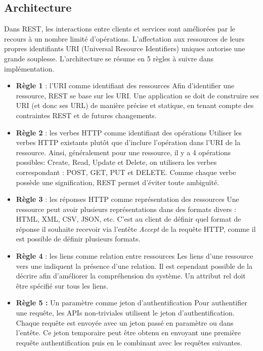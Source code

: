 \subsection{Architecture}
Dans REST, les interactions entre clients et services sont améliorées par le recours à un nombre limité d'opérations. L'affectation aux ressources de leurs propres identifiants URI (Universal Resource Identifiers) uniques autorise une grande souplesse. L'architecture se résume en 5 règles à suivre dans implémentation.\cite{refRegles}
\begin{itemize}
	\item \textbf{Règle 1} : l'URI comme identifiant des ressources\newline
	      Afin d'identifier une ressource, REST se base sur les URI. Une application se doit de construire ses URI (et donc ses URL) de manière précise et statique, en tenant compte des contraintes REST et de futures changements.
	\item \textbf{Règle 2} : les verbes HTTP comme identifiant des opérations\newline
	      Utiliser les verbes HTTP existants plutôt que d'inclure l'opération dans l'URI de la ressource. Ainsi, généralement pour une ressource, il y a 4 opérations possibles: Create, Read, Update et Delete, on utilisera les verbes correspondant : POST, GET, PUT et DELETE.
	      Comme chaque verbe possède une signification, REST permet d'éviter toute ambiguïté.
	\item \textbf{Règle 3} : les réponses HTTP comme représentation des ressources\newline
	      Une ressource peut avoir plusieurs représentations dans des formats divers : HTML, XML, CSV, JSON, etc. C'est au client de définir quel format de réponse il souhaite recevoir via l'entête \emph{Accept} de la requête HTTP, comme il est possible de définir plusieurs formats.
	\item \textbf{Règle 4} : les liens comme relation entre ressources\newline
	      Les liens d'une ressource vers une indiquent la présence d'une relation. Il est cependant possible de la décrire afin d'améliorer la compréhension du système. Un attribut rel doit être spécifié sur tous les liens.
	\item \textbf{Règle 5 :} Un paramètre comme jeton d'authentification\newline
	      Pour authentifier une requête, les APIs non-triviales utilisent le jeton d'authentification. Chaque requête est envoyée avec un jeton passé en paramètre ou dans l'entête. Ce jeton temporaire peut être obtenu en envoyant une première requête authentification puis en le combinant avec les requêtes suivantes.
\end{itemize}
